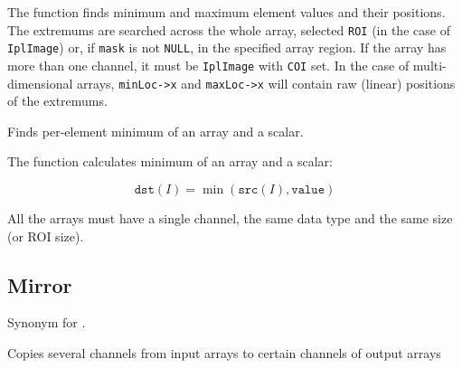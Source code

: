 \begin{description}
\end{description}

The function finds minimum and maximum element values
and their positions. The extremums are searched across the whole array,
selected \texttt{ROI} (in the case of \texttt{IplImage}) or, if \texttt{mask}
is not \texttt{NULL}, in the specified array region. If the array has
more than one channel, it must be \texttt{IplImage} with \texttt{COI}
set. In the case of multi-dimensional arrays, \texttt{minLoc->x} and \texttt{maxLoc->x}
will contain raw (linear) positions of the extremums.

Finds per-element minimum of an array and a scalar.


\begin{description}
\end{description}

The function calculates minimum of an array and a scalar:

\[
\texttt{dst}(I)=\min(\texttt{src}(I), \texttt{value})
\]

All the arrays must have a single channel, the same data type and the same size (or ROI size).


\subsection{Mirror}
Synonym for .

Copies several channels from input arrays to certain channels of output arrays



